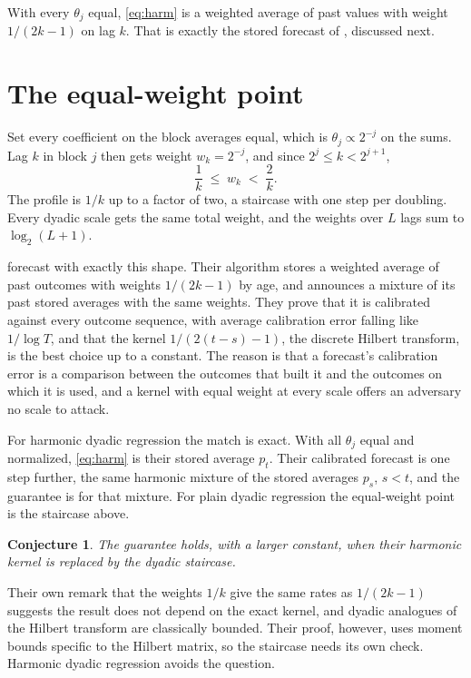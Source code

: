 \documentclass[11pt]{article}
\newtheorem{conjecture}{Conjecture}
\begin{document}
With every $\theta_j$ equal, \eqref{eq:harm} is a weighted average of past values with weight
$1/(2k-1)$ on lag $k$. That is exactly the stored forecast of \citet{fishelson2026}, discussed next.

\section{The equal-weight point}

Set every coefficient on the block averages equal, which is $\theta_j\propto 2^{-j}$ on the sums.
Lag $k$ in block $j$ then gets weight $w_k=2^{-j}$, and since $2^j\le k<2^{j+1}$,
\[
\frac1k\;\le\;w_k\;<\;\frac2k .
\]
The profile is $1/k$ up to a factor of two, a staircase with one step per doubling. Every dyadic
scale gets the same total weight, and the weights over $L$ lags sum to $\log_2(L+1)$.

\citet{fishelson2026} forecast with exactly this shape. Their algorithm stores a weighted average of
past outcomes with weights $1/(2k-1)$ by age, and announces a mixture of its past stored averages
with the same weights. They prove that it is calibrated against every outcome sequence, with
average calibration error falling like $1/\log T$, and that the kernel $1/(2(t-s)-1)$, the discrete
Hilbert transform, is the best choice up to a constant. The reason is that a forecast's calibration
error is a comparison between the outcomes that built it and the outcomes on which it is used, and
a kernel with equal weight at every scale offers an adversary no scale to attack.

For harmonic dyadic regression the match is exact. With all $\theta_j$ equal and normalized,
\eqref{eq:harm} is their stored average $p_t$. Their calibrated forecast is one step further, the
same harmonic mixture of the stored averages $p_s$, $s<t$, and the guarantee is for that mixture.
For plain dyadic regression the equal-weight point is the staircase above.

\begin{conjecture}
The \citet{fishelson2026} guarantee holds, with a larger constant, when their harmonic kernel is
replaced by the dyadic staircase.
\end{conjecture}

Their own remark that the weights $1/k$ give the same rates as $1/(2k-1)$ suggests the result does
not depend on the exact kernel, and dyadic analogues of the Hilbert transform are classically
bounded. Their proof, however, uses moment bounds specific to the Hilbert matrix, so the staircase
needs its own check. Harmonic dyadic regression avoids the question.
\end{document}
